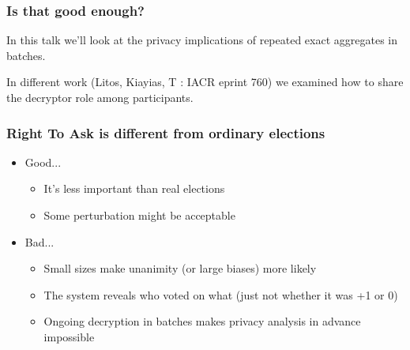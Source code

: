 \documentclass[10pt,xcolor=svgnames,169]{beamer} %
\begin{document}
	\begin{frame}
	\frametitle{Is that good enough?}	
		
	In this talk we'll look at the privacy implications of repeated exact aggregates in batches.
	
	In different work (Litos, Kiayias, T : IACR eprint 760) we examined how to share
	the decryptor role among participants.
	\end{frame}	
	

	
	\begin{frame}
	\frametitle{Right To Ask is different from ordinary elections}	
	
\begin{itemize}

	\item Good...
	\begin{itemize}
	\item It's less important than real elections
	\item Some perturbation might be acceptable
	\end{itemize}
	\item Bad...
\begin{itemize}
	\item Small sizes make unanimity (or large biases) more likely
	\item The system reveals who voted on what (just not whether it was +1 or 0)
	\item Ongoing decryption in batches makes privacy analysis in advance impossible
\end{itemize}
\end{itemize}
\end{frame}	
\end{document}
